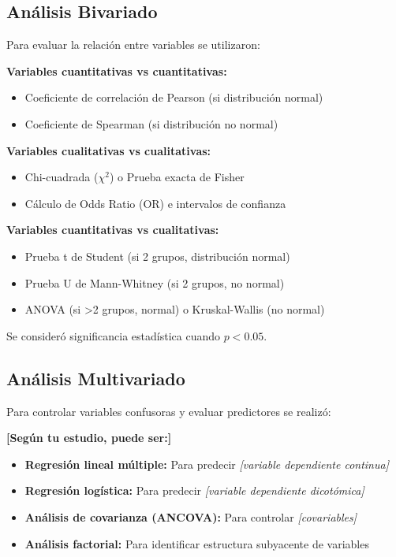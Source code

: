 \subsection{Análisis Bivariado}
\label{subsec:analisis_bivariado}

Para evaluar la relación entre variables se utilizaron:

\textbf{Variables cuantitativas vs cuantitativas:}
\begin{itemize}
    \item Coeficiente de correlación de Pearson (si distribución normal)
    \item Coeficiente de Spearman (si distribución no normal)
\end{itemize}

\textbf{Variables cualitativas vs cualitativas:}
\begin{itemize}
    \item Chi-cuadrada ($\chi^2$) o Prueba exacta de Fisher
    \item Cálculo de Odds Ratio (OR) e intervalos de confianza
\end{itemize}

\textbf{Variables cuantitativas vs cualitativas:}
\begin{itemize}
    \item Prueba t de Student (si 2 grupos, distribución normal)
    \item Prueba U de Mann-Whitney (si 2 grupos, no normal)
    \item ANOVA (si >2 grupos, normal) o Kruskal-Wallis (no normal)
\end{itemize}

Se consideró significancia estadística cuando $p < 0.05$.

\subsection{Análisis Multivariado}
\label{subsec:analisis_multivariado}

Para controlar variables confusoras y evaluar predictores se realizó:

\textbf{[Según tu estudio, puede ser:]}

\begin{itemize}
    \item \textbf{Regresión lineal múltiple:} Para predecir \textit{[variable dependiente continua]}
    \item \textbf{Regresión logística:} Para predecir \textit{[variable dependiente dicotómica]}
    \item \textbf{Análisis de covarianza (ANCOVA):} Para controlar \textit{[covariables]}
    \item \textbf{Análisis factorial:} Para identificar estructura subyacente de variables
\end{itemize}


